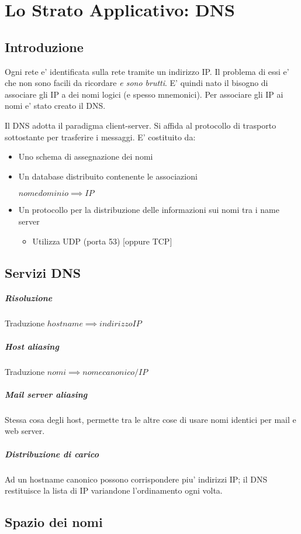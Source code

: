 \chapter{Lo Strato Applicativo: DNS}
\section{Introduzione}

Ogni rete e' identificata sulla rete tramite un indirizzo IP.
Il problema di essi e' che non sono facili da ricordare \textit{\tiny e sono brutti}.
E' quindi nato il bisogno di associare gli IP a dei nomi logici (e spesso mnemonici).
Per associare gli IP ai nomi e' stato creato il DNS.

Il DNS adotta il paradigma client-server.
Si affida al protocollo di trasporto sottostante per trasferire i messaggi.
E' costituito da:
\begin{itemize}
    \item Uno schema di assegnazione dei nomi
    \item Un database distribuito contenente le associazioni 
    \begin{center}
        $nome dominio \implies IP$
    \end{center}
    \item Un protocollo per la distribuzione delle informazioni sui nomi tra i name server
    \begin{itemize}
        \item Utilizza UDP (porta 53) [oppure TCP]
    \end{itemize}
\end{itemize}

\section{Servizi DNS}
\paragraph{Risoluzione} Traduzione $hostname \implies indirizzo IP$
\paragraph{Host aliasing} Traduzione $nomi \implies nome canonico / IP$
\paragraph{Mail server aliasing} Stessa cosa degli host, permette tra le altre cose di usare nomi identici per mail e web server.
\paragraph{Distribuzione di carico} Ad un hostname canonico possono corrispondere piu' indirizzi IP; il DNS restituisce la lista di IP variandone l'ordinamento ogni volta.
\newpage
\section{Spazio dei nomi}
